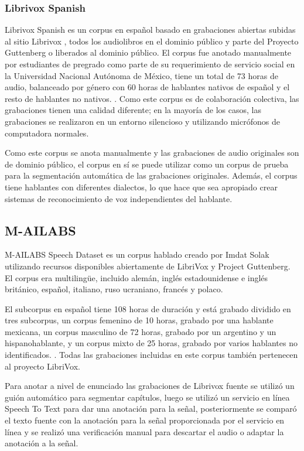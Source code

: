 \subsubsection {Librivox Spanish}

Librivox Spanish es un corpus en español basado en grabaciones abiertas subidas al sitio Librivox \cite{LibriVox}, todos los audiolibros en el dominio público y parte del Proyecto Guttenberg \cite{gutenberg} o liberados al dominio público. El corpus fue anotado manualmente por estudiantes de pregrado como parte de su requerimiento de servicio social en la Universidad Nacional Autónoma de México, tiene un total de 73 horas de audio, balanceado por género con 60 horas de hablantes nativos de español y el resto de hablantes no nativos. . Como este corpus es de colaboración colectiva, las grabaciones tienen una calidad diferente; en la mayoría de los casos, las grabaciones se realizaron en un entorno silencioso y utilizando micrófonos de computadora normales.

Como este corpus se anota manualmente y las grabaciones de audio originales son de dominio público, el corpus en sí se puede utilizar como un corpus de prueba para la segmentación automática de las grabaciones originales. Además, el corpus tiene hablantes con diferentes dialectos, lo que hace que sea apropiado crear sistemas de reconocimiento de voz independientes del hablante.

\subsection{M-AILABS}

M-AILABS Speech Dataset es un corpus hablado creado por Imdat Solak utilizando recursos disponibles abiertamente de LibriVox y Project Guttenberg. El corpus era multilingüe, incluido alemán, inglés estadounidense e inglés británico, español, italiano, ruso ucraniano, francés y polaco.

El subcorpus en español tiene 108 horas de duración y está grabado dividido en tres subcorpus, un corpus femenino de 10 horas, grabado por una hablante mexicana, un corpus masculino de 72 horas, grabado por un argentino y un hispanohablante, y un corpus mixto de 25 horas, grabado por varios hablantes no identificados. . Todas las grabaciones incluidas en este corpus también pertenecen al proyecto LibriVox.

Para anotar a nivel de enunciado las grabaciones de Librivox fuente se utilizó un guión automático para segmentar capítulos, luego se utilizó un servicio en línea Speech To Text para dar una anotación para la señal, posteriormente se comparó el texto fuente con la anotación para la señal proporcionada por el servicio en línea y se realizó una verificación manual para descartar el audio o adaptar la anotación a la señal.

